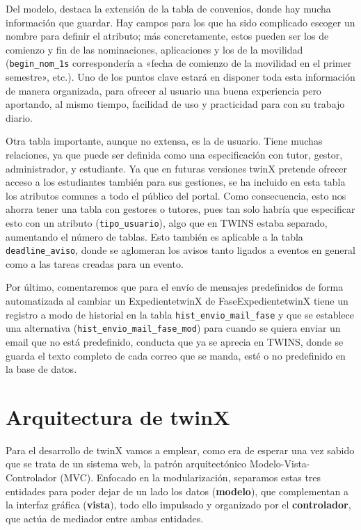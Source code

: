 Del modelo, destaca la extensión de la tabla de convenios, donde hay mucha información que guardar. Hay campos para los que ha sido complicado escoger un nombre para definir el atributo; más concretamente, estos pueden ser los de comienzo y fin de las nominaciones, aplicaciones y los de la movilidad (\texttt{begin\_nom\_1s} correspondería a «fecha de comienzo de la movilidad en el primer semestre», etc.). Uno de los puntos clave estará en disponer toda esta información de manera organizada, para ofrecer al usuario una buena experiencia pero aportando, al mismo tiempo, facilidad de uso y practicidad para con su trabajo diario.

Otra tabla importante, aunque no extensa, es la de usuario. Tiene muchas relaciones, ya que puede ser definida como una especificación con tutor, gestor, administrador, y estudiante. Ya que en futuras versiones twinX pretende ofrecer acceso a los estudiantes también para sus gestiones, se ha incluido en esta tabla los atributos comunes a todo el público del portal. Como consecuencia, esto nos ahorra tener una tabla con gestores o tutores, pues tan solo habría que especificar esto con un atributo (\texttt{tipo\_usuario}), algo que en TWINS estaba separado, aumentando el número de tablas. Esto también es aplicable a la tabla \texttt{deadline\_aviso}, donde se aglomeran los avisos tanto ligados a eventos en general como a las tareas creadas para un evento.

Por último, comentaremos que para el envío de mensajes predefinidos de forma automatizada al cambiar un \gls{ExpedientetwinX} de \gls{FaseExpedientetwinX} tiene un registro a modo de historial en la tabla \texttt{hist\_envio\_mail\_fase} y que se establece una alternativa (\texttt{hist\_envio\_mail\_fase\_mod}) para cuando se quiera enviar un email que no está predefinido, conducta que ya se aprecia en TWINS, donde se guarda el texto completo de cada correo que se manda, esté o no predefinido en la base de datos.

\section{Arquitectura de twinX}

Para el desarrollo de twinX vamos a emplear, como era de esperar una vez sabido que se trata de un sistema web, la patrón arquitectónico Modelo-Vista-Controlador (MVC). Enfocado en la modularización, separamos estas tres entidades para poder dejar de un lado los datos (\textbf{modelo}), que complementan a la interfaz gráfica (\textbf{vista}), todo ello impulsado y organizado por el \textbf{controlador}, que actúa de mediador entre ambas entidades.

